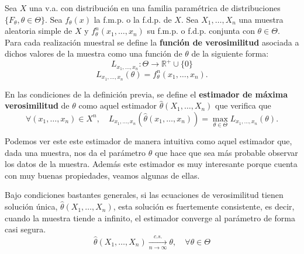 \begin{definition}
    Sea $X$ una \ac{v.a.} con distribución en una familia paramétrica de distribuciones $\{ F_\theta, \theta \in \Theta \}$. Sea $f_\theta(x)$ la \ac{f.m.p.} o la \ac{f.d.p.} de $X$. Sea $X_1, \ldots, X_n$ una muestra aleatoria simple de $X$ y $f^n_\theta(x_1, \ldots, x_n)$ su \ac{f.m.p.} o \ac{f.d.p.} conjunta con $\theta \in \Theta$. Para cada realización muestral se define la  \textbf{función de verosimilitud} asociada a dichos valores de la muestra como una función de $\theta$ de la siguiente forma:
    \begin{equation}
        L_{x_1, \ldots, x_n}: \Theta \to \mathbb{R}^+ \cup \{0\} 
    \end{equation}
    \begin{equation}
        L_{x_1, \ldots, x_n}(\theta) =  f_\theta^n(x_1, \ldots, x_n).
    \end{equation}
\end{definition}

\begin{definition}
    En las condiciones de la definición previa, se define el \textbf{estimador de máxima verosimilitud} de $\theta$ como aquel estimador $\hat{\theta}(X_1, \ldots, X_n)$ que verifica que
    \begin{equation}
        \forall (x_1, \ldots, x_n) \in X^n, \quad L_{x_1, \ldots, x_n}(\hat{\theta}(x_1, \ldots, x_n))= \max_{\theta \in \Theta}L_{x_1, \ldots, x_n}(\theta).
    \end{equation}
\end{definition}

Podemos ver este este estimador de manera intuitiva como aquel estimador que, dada una muestra, nos da el parámetro $\theta$ que hace que sea más probable observar los datos de la muestra. Además este estimador es muy interesante porque cuenta con muy buenas propiedades, veamos algunas de ellas.

\begin{proposition}
    Bajo condiciones bastantes generales, si las ecuaciones de verosimilitud tienen solución única, $\hat{\theta}(X_1, \ldots, X_n)$, esta solución es fuertemente consistente, es decir, cuando la muestra tiende a infinito, el estimador converge al parámetro de forma casi segura.
    \begin{equation}
        \hat{\theta}(X_1, \ldots, X_n) \xrightarrow[n \to \infty]{c.s.} \theta, \quad \forall \theta \in \Theta
    \end{equation}
\end{proposition}

